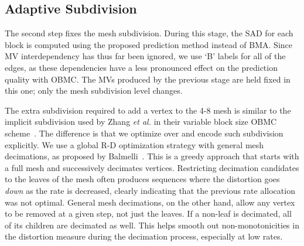 \documentclass[11pt,letterpaper]{article}
\begin{document}
\subsection{Adaptive Subdivision}

The second step fixes the mesh subdivision.
During this stage, the SAD for each block is computed using the proposed
 prediction method instead of BMA.
Since MV interdependency has thus far been ignored, we use `B' labels for all
 of the edges, as these dependencies have a less pronounced effect on the
 prediction quality with OBMC.
The MVs produced by the previous stage are held fixed in this one; only the
 mesh subdivision level changes.

The extra subdivision required to add a vertex to the 4-8 mesh is similar to
 the implicit subdivision used by Zhang \textit{et al.} in their variable block
 size OBMC scheme~\cite{ZAS98}.
The difference is that we optimize over and encode such subdivision explicitly.
We use a global R-D optimization strategy with general mesh decimations, as
 proposed by Balmelli~\cite{Bal01}.
This is a greedy approach that starts with a full mesh and successively
 decimates vertices.
Restricting decimation candidates to the leaves of the mesh often produces
 sequences where the distortion goes \textit{down} as the rate is decreased,
 clearly indicating that the previous rate allocation was not optimal.
General mesh decimations, on the other hand, allow any vertex to be removed at
 a given step, not just the leaves.
If a non-leaf is decimated, all of its children are decimated as well.
This helps smooth out non-monotonicities in the distortion measure during the
 decimation process, especially at low rates.
\end{document}
